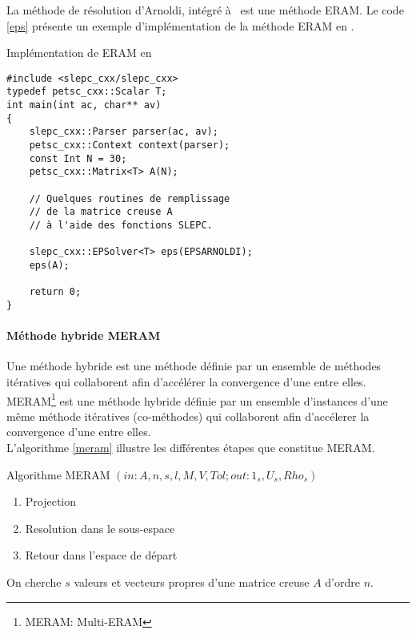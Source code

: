 La méthode de résolution d'Arnoldi, intégré à \slepc\, est une méthode ERAM. Le code \ref{eps} présente un exemple d'implémentation de la méthode ERAM en \slepcx.

\begin{algorithm}[h]
  \caption{Implémentation de ERAM en \slepcx}
  \label{eps}
\begin{verbatim}
#include <slepc_cxx/slepc_cxx>
typedef petsc_cxx::Scalar T;
int main(int ac, char** av)
{
    slepc_cxx::Parser parser(ac, av);
    petsc_cxx::Context context(parser);
    const Int N = 30;
    petsc_cxx::Matrix<T> A(N);

    // Quelques routines de remplissage
    // de la matrice creuse A
    // à l'aide des fonctions SLEPC.

    slepc_cxx::EPSolver<T> eps(EPSARNOLDI);
    eps(A);

    return 0;
}
\end{verbatim}
\end{algorithm}

\paragraph{Méthode hybride MERAM}

Une méthode hybride est une méthode définie par un ensemble de méthodes itératives qui collaborent afin d'accélérer la convergence d'une entre elles.\\

MERAM\footnote{MERAM: Multi-ERAM} est une méthode hybride définie par un ensemble d'instances d'une même méthode itératives (co-méthodes) qui collaborent afin d'accélerer la convergence d'une entre elles.\\

L'algorithme \ref{meram} illustre les différentes étapes que constitue MERAM.\\

\begin{algorithm}[h]
  \caption{Algorithme MERAM $(in:A,n,s,l,M,V,Tol;out: 1_s, U_s, Rho_s)$}
  \label{meram}
  \begin{enumerate}
  \item Projection
  \item Resolution dans le sous-espace
  \item Retour dans l'espace de départ
  \end{enumerate}
\end{algorithm}

On cherche $s$ valeurs et vecteurs propres d'une matrice creuse $A$ d'ordre $n$.


